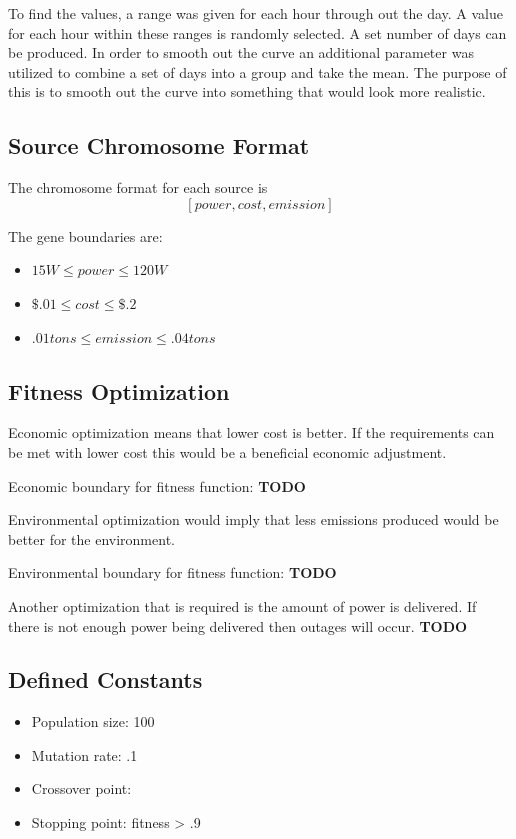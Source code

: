 \documentclass{article}
\begin{document}
    To find the values, a range was given for each hour through out the day.
    A value for each hour within these ranges is randomly selected.  A set
    number of days can be produced.  In order to smooth out the curve an additional parameter was utilized to combine a set of days into a group and take the mean.  The purpose of this is to smooth out the curve into something that would look more realistic.

    \subsection{Source Chromosome Format}
    The chromosome format for each source is
    \[[power, cost, emission]\]

    The gene boundaries are:
    \begin{itemize}
        \item \(15W \leq power \leq 120W\)
        \item \(\$.01 \leq cost \leq \$.2\)
        \item \(.01 tons \leq emission \leq .04 tons\)
    \end{itemize}

    \subsection{Fitness Optimization}
    Economic optimization means that lower cost is better.  If the requirements can be met with lower cost this would be a beneficial economic adjustment.

    Economic boundary for fitness function:
    \textbf{TODO}
    \newline 

    Environmental optimization would imply that less emissions produced would be better for the environment.

    Environmental boundary for fitness function:
    \textbf{TODO}
    \newline 

    Another optimization that is required is the amount of power is delivered.  If there is not enough power being delivered then outages will occur.
    \textbf{TODO}

    \subsection{Defined Constants}
        \begin{itemize}
            \item Population size: 100
            \item Mutation rate: .1
            \item Crossover point:
            \item Stopping point: fitness > .9
        \end{itemize}
\end{document}
